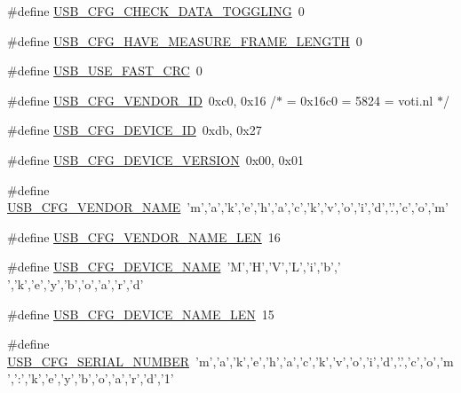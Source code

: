 \begin{DoxyCompactItemize}
\item 
\#define \hyperlink{mhvlib-_vusb-_keyboard_2vusb_2usbconfig_8h_a343f7b4bd7f8ba0348e106ef0f434215}{U\-S\-B\-\_\-\-C\-F\-G\-\_\-\-C\-H\-E\-C\-K\-\_\-\-D\-A\-T\-A\-\_\-\-T\-O\-G\-G\-L\-I\-N\-G}~0
\item 
\#define \hyperlink{mhvlib-_vusb-_keyboard_2vusb_2usbconfig_8h_a64864300fd8efb3c8d636b5c52f46fe7}{U\-S\-B\-\_\-\-C\-F\-G\-\_\-\-H\-A\-V\-E\-\_\-\-M\-E\-A\-S\-U\-R\-E\-\_\-\-F\-R\-A\-M\-E\-\_\-\-L\-E\-N\-G\-T\-H}~0
\item 
\#define \hyperlink{mhvlib-_vusb-_keyboard_2vusb_2usbconfig_8h_a056ce5afad0b0620c90bab5bd81e4166}{U\-S\-B\-\_\-\-U\-S\-E\-\_\-\-F\-A\-S\-T\-\_\-\-C\-R\-C}~0
\item 
\#define \hyperlink{mhvlib-_vusb-_keyboard_2vusb_2usbconfig_8h_a9326b8ec9f809ce66d54349691646930}{U\-S\-B\-\_\-\-C\-F\-G\-\_\-\-V\-E\-N\-D\-O\-R\-\_\-\-I\-D}~0xc0, 0x16 /$\ast$ = 0x16c0 = 5824 = voti.\-nl $\ast$/
\item 
\#define \hyperlink{mhvlib-_vusb-_keyboard_2vusb_2usbconfig_8h_abc740455309399430b0f49bf7931d1d7}{U\-S\-B\-\_\-\-C\-F\-G\-\_\-\-D\-E\-V\-I\-C\-E\-\_\-\-I\-D}~0xdb, 0x27
\item 
\#define \hyperlink{mhvlib-_vusb-_keyboard_2vusb_2usbconfig_8h_aba3c7c0cd4055ba3bbf5df38e57b6d27}{U\-S\-B\-\_\-\-C\-F\-G\-\_\-\-D\-E\-V\-I\-C\-E\-\_\-\-V\-E\-R\-S\-I\-O\-N}~0x00, 0x01
\item 
\#define \hyperlink{mhvlib-_vusb-_keyboard_2vusb_2usbconfig_8h_a25a2baf5c8feb0982a47050423add0ec}{U\-S\-B\-\_\-\-C\-F\-G\-\_\-\-V\-E\-N\-D\-O\-R\-\_\-\-N\-A\-M\-E}~'m','a','k','e','h','a','c','k','v','o','i','d','.','c','o','m'
\item 
\#define \hyperlink{mhvlib-_vusb-_keyboard_2vusb_2usbconfig_8h_a3085d820d9dc6e939737a3f1b9a457d7}{U\-S\-B\-\_\-\-C\-F\-G\-\_\-\-V\-E\-N\-D\-O\-R\-\_\-\-N\-A\-M\-E\-\_\-\-L\-E\-N}~16
\item 
\#define \hyperlink{mhvlib-_vusb-_keyboard_2vusb_2usbconfig_8h_a9b482a2b2740652ffe7dcb6695ca0c91}{U\-S\-B\-\_\-\-C\-F\-G\-\_\-\-D\-E\-V\-I\-C\-E\-\_\-\-N\-A\-M\-E}~'M','H','V','L','i','b',' ','k','e','y','b','o','a','r','d'
\item 
\#define \hyperlink{mhvlib-_vusb-_keyboard_2vusb_2usbconfig_8h_ae68f17e6baf13805abc56e74beadeb57}{U\-S\-B\-\_\-\-C\-F\-G\-\_\-\-D\-E\-V\-I\-C\-E\-\_\-\-N\-A\-M\-E\-\_\-\-L\-E\-N}~15
\item 
\#define \hyperlink{mhvlib-_vusb-_keyboard_2vusb_2usbconfig_8h_a854f9931a43692546ac669ad8b7c4a98}{U\-S\-B\-\_\-\-C\-F\-G\-\_\-\-S\-E\-R\-I\-A\-L\-\_\-\-N\-U\-M\-B\-E\-R}~'m','a','k','e','h','a','c','k','v','o','i','d','.','c','o','m','\-:','k','e','y','b','o','a','r','d','1'

\end{DoxyCompactItemize}
